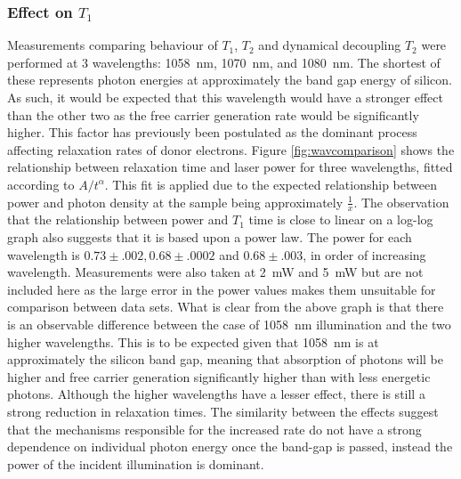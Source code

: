 \subsubsection{Effect on $T_1$}

Measurements comparing behaviour of $T_1$, $T_2$ and dynamical decoupling $T_2$ were performed at 3 wavelengths: 1058~nm, 1070~nm, and 1080~nm.
The shortest of these represents photon energies at approximately the band gap energy of silicon. 
As such, it would be expected that this wavelength would have a stronger effect than the other two as the free carrier generation rate would be significantly higher.
This factor has previously been postulated as the dominant process affecting relaxation rates of donor electrons.
Figure \ref{fig:wavcomparison} shows the relationship between relaxation time and laser power for three wavelengths, fitted according to $A/t^{\alpha}$. 
This fit is applied due to the expected relationship between power and photon density at the sample being approximately $\frac{1}{x}$. 
The observation that the relationship between power and $T_1$ time is close to linear on a log-log graph also suggests that it is based upon a power law.
The power for each wavelength is $0.73\pm.002, 0.68\pm.0002$ and $0.68\pm.003$, in order of increasing wavelength.
Measurements were also taken at 2~mW and 5~mW but are not included here as the large error in the power values makes them unsuitable for comparison between data sets. 
What is clear from the above graph is that there is an observable difference between the case of 1058~nm illumination and the two higher wavelengths. 
This is to be expected given that 1058~nm is at approximately the silicon band gap, meaning that absorption of photons will be higher and free carrier generation significantly higher than with less energetic photons.
Although the higher wavelengths have a lesser effect, there is still a strong reduction in relaxation times.
The similarity between the effects suggest that the mechanisms responsible for the increased rate do not have a strong dependence on individual photon energy once the band-gap is passed, instead the power of the incident illumination is dominant. 

